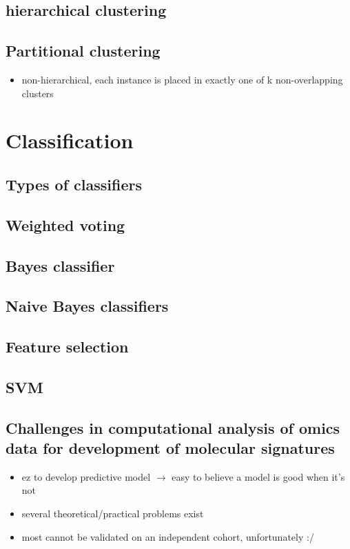 \documentclass[font=12pt]{article}
\begin{document}
\subsection{hierarchical clustering}

\subsection{Partitional clustering}
\begin{itemize}
	\item non-hierarchical, each instance is placed in exactly one of k non-overlapping clusters
\end{itemize}

\newpage
\section{Classification}
\subsection{Types of classifiers}

\subsection{Weighted voting}

\subsection{Bayes classifier}

\subsection{Naive Bayes classifiers}

\subsection{Feature selection}

\subsection{SVM}

\subsection{Challenges in computational analysis of omics data for development of molecular signatures}
\begin{itemize}
	\item ez to develop predictive model $\to$ easy to believe a model is good when it's not
	\item several theoretical/practical problems exist
	\item most cannot be validated on an independent cohort, unfortunately :/
\end{itemize}
\end{document}
